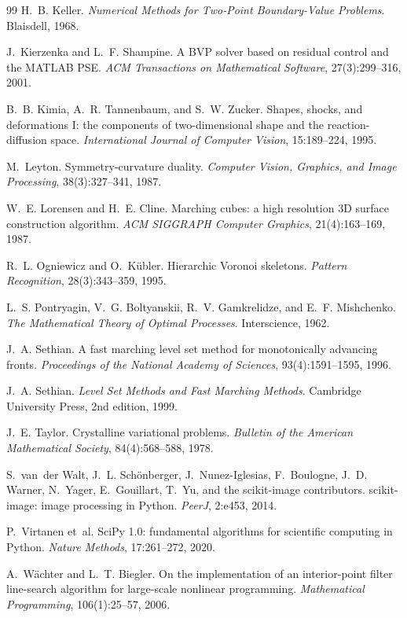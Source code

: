 \documentclass[11pt,a4paper]{article}
\numberwithin{equation}{section}
\theoremstyle{plain}
\theoremstyle{definition}
\theoremstyle{remark}
\begin{document}
\begin{thebibliography}{99}
H.~B. Keller.
\newblock \emph{Numerical Methods for Two-Point Boundary-Value Problems}.
\newblock Blaisdell, 1968.

J.~Kierzenka and L.~F. Shampine.
\newblock A BVP solver based on residual control and the MATLAB PSE.
\newblock \emph{ACM Transactions on Mathematical Software}, 27(3):299--316, 2001.

B.~B. Kimia, A.~R. Tannenbaum, and S.~W. Zucker.
\newblock Shapes, shocks, and deformations I: the components of two-dimensional shape and the reaction-diffusion space.
\newblock \emph{International Journal of Computer Vision}, 15:189--224, 1995.

M.~Leyton.
\newblock Symmetry-curvature duality.
\newblock \emph{Computer Vision, Graphics, and Image Processing}, 38(3):327--341, 1987.

W.~E. Lorensen and H.~E. Cline.
\newblock Marching cubes: a high resolution 3D surface construction algorithm.
\newblock \emph{ACM SIGGRAPH Computer Graphics}, 21(4):163--169, 1987.

R.~L. Ogniewicz and O.~K\"ubler.
\newblock Hierarchic Voronoi skeletons.
\newblock \emph{Pattern Recognition}, 28(3):343--359, 1995.

L.~S. Pontryagin, V.~G. Boltyanskii, R.~V. Gamkrelidze, and E.~F. Mishchenko.
\newblock \emph{The Mathematical Theory of Optimal Processes}.
\newblock Interscience, 1962.

J.~A. Sethian.
\newblock A fast marching level set method for monotonically advancing fronts.
\newblock \emph{Proceedings of the National Academy of Sciences}, 93(4):1591--1595, 1996.

J.~A. Sethian.
\newblock \emph{Level Set Methods and Fast Marching Methods}.
\newblock Cambridge University Press, 2nd edition, 1999.

J.~E. Taylor.
\newblock Crystalline variational problems.
\newblock \emph{Bulletin of the American Mathematical Society}, 84(4):568--588, 1978.

S.~van~der Walt, J.~L. Sch\"onberger, J.~Nunez-Iglesias, F.~Boulogne, J.~D. Warner, N.~Yager, E.~Gouillart, T.~Yu, and the scikit-image contributors.
\newblock scikit-image: image processing in Python.
\newblock \emph{PeerJ}, 2:e453, 2014.

P.~Virtanen et~al.
\newblock SciPy 1.0: fundamental algorithms for scientific computing in Python.
\newblock \emph{Nature Methods}, 17:261--272, 2020.

A.~W\"achter and L.~T. Biegler.
\newblock On the implementation of an interior-point filter line-search algorithm for large-scale nonlinear programming.
\newblock \emph{Mathematical Programming}, 106(1):25--57, 2006.
\end{thebibliography}
\end{document}
